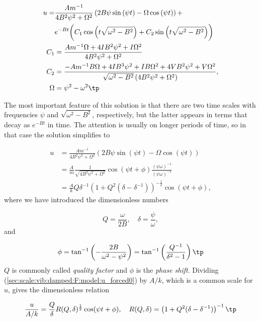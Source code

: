 \documentclass[graybox,envcountchap,sectrefs,final]{svmonodo}
\begin{document}
\begin{align*} u = &
\frac{Am^{-1}}{4 B^{2} \psi^{2} +
\Omega^{2}} \left(2 B \psi
\sin{\left (\psi t \right )} - \Omega\cos{\left (\psi t \right )}\right) + \\ 
&
{e^{-B t}} \biggl(
C_1 \cos{\left( t \sqrt{\omega^{2}- B^{2}}\right)} +
C_2 \sin{\left (t \sqrt{\omega^{2}- B^{2}}\right )}\biggr)\\ 
C_1 &= \frac{Am^{-1} \Omega + 4 I B^{2} \psi^{2} +
I\Omega^2}{
4 B^{2} \psi^{2} + \Omega^2}\\ 
C_2 &=
\frac{- Am^{-1} B\Omega + 4 I B^{3} \psi^{2} +
I B\Omega^2 + 4 V B^{2}\psi^{2} +
V\Omega^2}{
\sqrt{\omega^{2} - B^{2}}
\left(4 B^{2} \psi^{2} + \Omega^2\right)},\\ 
\Omega &= \psi^2 - \omega^2\tp
\end{align*}


The most important feature of this solution is that there are
two time scales with frequencies $\psi$ and $\sqrt{\omega^2 - B^2}$,
respectively,
but the latter appears in terms that decay as $e^{-Bt}$ in time.
The attention is usually on longer periods of time, so in that
case the solution simplifies to

\begin{align}
u &= \frac{Am^{-1}}{4 B^{2} \psi^{2} +
\Omega^{2}} \left(2 B \psi
\sin{\left (\psi t \right )} - \Omega\cos{\left (\psi t \right )}\right)
\nonumber\\ 
&= \frac{A}{m}\frac{1}{\sqrt{4B^2\psi^2 + \Omega^2}}\cos(\psi t + \phi)
\frac{(\psi\omega)^{-1}}{(\psi\omega)^{-1}}
\nonumber\\ 
& = \frac{A}{k} Q\delta^{-1}\left(1 + Q^2(\delta - \delta^{-1})\right)^{-
\frac{1}{2}}\cos(\psi t + \phi),
\label{sec:scale:vib:damped:F:model:u_forced0}
\end{align}
where we have introduced the dimensionless numbers

\[ Q = \frac{\omega}{2B},\quad\delta = \frac{\psi}{\omega},\]
and

\[ \phi = \tan^{-1}\left(-\frac{2B}{\omega^2 - \psi^2}\right)
= \tan^{-1}\left(\frac{Q^{-1}}{\delta^2 - 1}\right)\tp\]
$Q$ is commonly called \emph{quality factor} and $\phi$ is the
\emph{phase shift}. Dividing
(\ref{sec:scale:vib:damped:F:model:u_forced0}) by $A/k$, which is a common
scale for $u$, gives the dimensionless relation

\begin{equation}
\frac{u}{A/k} = \frac{Q}{\delta} R(Q,\delta)^{\frac{1}{2}}\cos(\psi t + \phi),
\quad
R(Q,\delta) = \left(1 + Q^2(\delta - \delta^{-1})\right)^{-1}\tp
\label{sec:scale:vib:damped:F:model:u_forced}
\end{equation}
\end{document}
